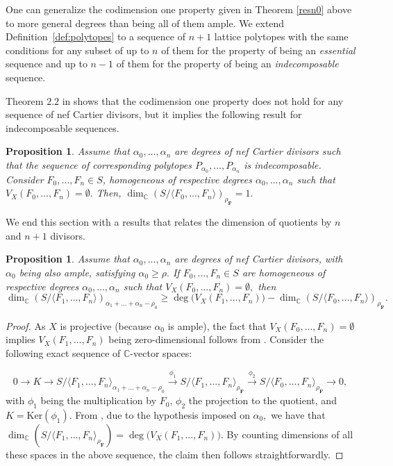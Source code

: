 \documentclass[a4paper,11pt]{amsart}
\newcommand{\C}{\mathbb{C}}
\newcommand{\bfF}{{\boldsymbol{F}}}
\newcounter{thm}
\numberwithin{thm}{section}
\numberwithin{equation}{section}
\theoremstyle{definition}
\theoremstyle{plain}
\newtheorem{proposition}[thm]{Proposition}
\begin{document}
\smallskip

One can generalize the codimension one property given in Theorem \ref{resn0} above to more general degrees than being all of them ample.  We extend Definition~\ref{def:polytopes} to a sequence of $n+1$ lattice polytopes with the same conditions for any subset of up to $n$ of them for the property of being an {\em essential } sequence and up to $n-1$ of them for the property of being an {\em indecomposable} sequence. 

 Theorem $2.2$ in \cite{CD05} shows that the codimension one property does not hold for any sequence of nef Cartier divisors, but it implies the following result for indecomposable sequences.

\begin{proposition}\label{cd1}
Assume that $\alpha_0,\ldots, \alpha_n$ are degrees of nef Cartier divisors  such that the sequence of corresponding polytopes $P_{\alpha_0}, \dots, P_{\alpha_n}$ is indecomposable. 
Consider $F_0,\ldots, F_n\in S$, homogeneous  of respective degrees $\alpha_0,\ldots, \alpha_n$ such that $V_X(F_0,\ldots, F_n)=\emptyset.$ Then, $\dim_\C\left(S/\langle F_0,\ldots, F_n\rangle\right)_{\rho_\bfF}=1.$
\end{proposition}

We end this section with a results that relates the dimension of quotients by $n$ and $n+1$ divisors.

\begin{proposition}\label{bound}
Assume that  $\alpha_0,\ldots, \alpha_n$ are degrees of nef Cartier divisors, with $\alpha_0$ being also ample, satisfying  $\alpha_0\geq \rho.$ If $F_0,\ldots, F_n\in S$ are homogeneous  of respective degrees $\alpha_0,\ldots, \alpha_n$ such that $V_X(F_0,\ldots, F_n)=\emptyset,$ then  
$$\dim_\C\left(S/\langle F_1,\ldots, F_n\rangle\right)_{\alpha_1+\ldots+\alpha_n-\rho_0}\geq \deg\big(V_X(F_1,\ldots, F_n)\big)- \dim_\C\left(S/\langle F_0,\ldots, F_n\rangle\right)_{\rho_\bfF}.
$$
\end{proposition}
\begin{proof}
As $X$ is projective (because $\alpha_0$ is ample), the fact that $V_X(F_0,\ldots, F_n)=\emptyset$ implies  $V_X(F_1,\ldots, F_n)$ being zero-dimensional follows from \cite[Lemma $4.14$]{CCD97}.
Consider the following exact sequence of $\C$-vector spaces:

$$0\to K\to  S/\langle F_1,\ldots, F_n\rangle_{\alpha_1+\ldots+\alpha_n-\rho_0}\stackrel{\phi_1}{\to}S/\langle F_1,\ldots, F_n\rangle_{\rho_\bfF}\stackrel{\phi_2}{\to} S/\langle F_0,\ldots, F_n\rangle_{\rho_\bfF}\to0,$$
with $\phi_1$ being the multiplication by $F_0,\, \phi_2$ the projection to the quotient, and $K=\mbox{Ker}(\phi_1).$  From \cite[Theorem $4.4$]{BT22}, due to the hypothesis imposed on $\alpha_0,$ we have that $\dim_\C\left(S/\langle F_1,\ldots, F_n\rangle_{\rho_\bfF}\right)= \deg\big(V_X(F_1,\ldots, F_n)\big).$ By counting dimensions of all these spaces in the above sequence, the claim then follows straightforwardly. 
\end{proof}
 
\end{document}
